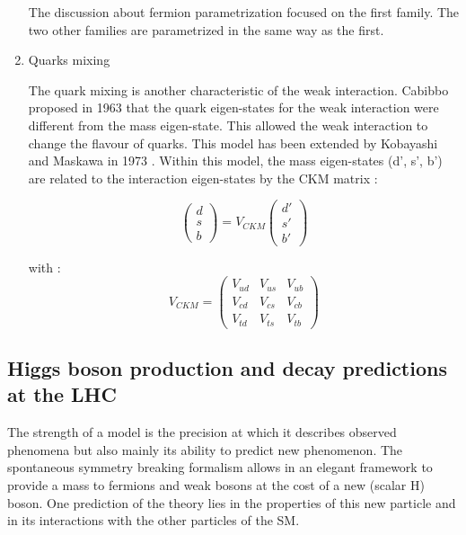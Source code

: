 \begin{enumerate}
The discussion about fermion parametrization focused on the first family.
The two other families are parametrized in the same way as the first.

\item Quarks mixing
\label{sec:org603067f}

The quark mixing is another characteristic of the weak interaction.
Cabibbo \cite{CERN-TH-342} proposed in 1963 that the quark eigen-states for the weak interaction were different from the mass eigen-state.
This allowed the weak interaction to change the flavour of quarks.
This model has been extended by Kobayashi and Maskawa in 1973 \cite{KUNS-242}.
Within this model, the mass eigen-states (d', s', b') are related to the interaction eigen-states by the CKM matrix :

\begin{equation}
\begin{pmatrix}d\\s\\b\end{pmatrix}
= V_{CKM}
\begin{pmatrix}d'\\s'\\b'\end{pmatrix}
\end{equation}

with :
\begin{equation}
V_{CKM}=
\begin{pmatrix}V_{ud}&V_{us}&V_{ub}\\V_{cd}&V_{cs}&V_{cb}\\V_{td}&V_{ts}&V_{tb}\end{pmatrix}
\end{equation}
\end{enumerate}

\subsection{Higgs boson production and decay predictions at the LHC}
\label{sec:org649229c}

The strength of a model is the precision at which it describes observed phenomena but also mainly its ability to predict new phenomenon.
The spontaneous symmetry breaking formalism allows in an elegant framework to provide a mass to fermions and weak bosons at the cost of a new (scalar H) boson.
One prediction of the theory lies in the properties of this new particle and in its interactions with the other particles of the SM.

